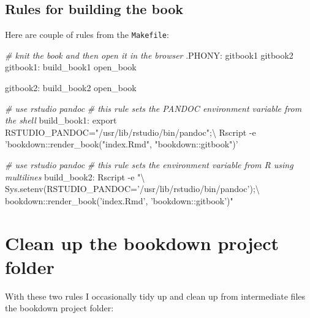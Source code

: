 \documentclass[
]{book}
\newenvironment{Shaded}{\begin{snugshade}}{\end{snugshade}}
\newcommand{\CharTok}[1]{\textcolor[rgb]{0.5,0.5,0.5}{#1}}
\newcommand{\CommentTok}[1]{\textcolor[rgb]{0.37,0.37,0.37}{\textit{#1}}}
\newcommand{\DataTypeTok}[1]{\textcolor[rgb]{0.27,0.27,0.27}{#1}}
\newcommand{\DecValTok}[1]{\textcolor[rgb]{0.06,0.06,0.06}{#1}}
\newcommand{\NormalTok}[1]{#1}
\newcommand{\OtherTok}[1]{\textcolor[rgb]{0.37,0.37,0.37}{#1}}
\newcommand{\StringTok}[1]{\textcolor[rgb]{0.5,0.5,0.5}{#1}}
\begin{document}
\hypertarget{rules-for-building-the-book}{%
\subsection*{Rules for building the book}\label{rules-for-building-the-book}}


Here are couple of rules from the \texttt{Makefile}:

\begin{Shaded}
\begin{Highlighting}[]
\CommentTok{# knit the book and then open it in the browser}
\OtherTok{.PHONY:}\DataTypeTok{ gitbook1 gitbook2}
\DecValTok{gitbook1:}\DataTypeTok{ build_book1 open_book}

\DecValTok{gitbook2:}\DataTypeTok{ build_book2 open_book}

\CommentTok{# use rstudio pandoc}
\CommentTok{# this rule sets the PANDOC environment variable from the shell}
\DecValTok{build_book1:}
\NormalTok{    export RSTUDIO_PANDOC=}\StringTok{"/usr/lib/rstudio/bin/pandoc"}\NormalTok{;}\CharTok{\textbackslash{}}
\NormalTok{    Rscript -e }\StringTok{'bookdown::render_book("index.Rmd", "bookdown::gitbook")'}

\CommentTok{# use rstudio pandoc}
\CommentTok{# this rule sets the environment variable from R using multilines}
\DecValTok{build_book2:}
\NormalTok{    Rscript -e }\StringTok{"}\CharTok{\textbackslash{}}
\StringTok{    Sys.setenv(RSTUDIO_PANDOC='/usr/lib/rstudio/bin/pandoc');}\CharTok{\textbackslash{}}
\StringTok{    bookdown::render_book('index.Rmd', 'bookdown::gitbook')"}
\end{Highlighting}
\end{Shaded}

\hypertarget{clean-up-the-bookdown-project-folder}{%
\section*{Clean up the bookdown project folder}\label{clean-up-the-bookdown-project-folder}}


With these two rules I occasionally tidy up and clean up from intermediate files the bookdown project folder:
\end{document}
